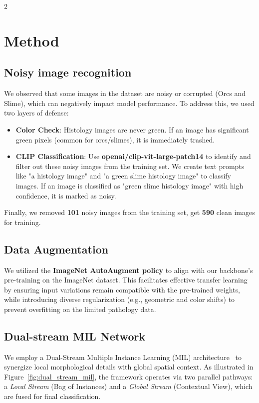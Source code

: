 \documentclass[11pt]{article}
\begin{document}
\begin{multicols}{2}
    \section{Method}
    \subsection{Noisy image recognition}
    We observed that some images in the dataset are noisy or corrupted (Orcs and Slime), which can negatively impact model performance. To address this, we used two layers of defense:
    \begin{itemize}
        \item \textbf{Color Check}: Histology images are never green. If an image has significant green pixels (common for orcs/slimes), it is immediately trashed.
        \item \textbf{CLIP Classification}: Use \textbf{openai/clip-vit-large-patch14} to identify and filter out these noisy images from the training set. We create text prompts like "a histology image" and "a green slime histology image" to classify images. If an image is classified as "green slime histology image" with high confidence, it is marked as noisy.
    \end{itemize}
    Finally, we removed \textbf{101} noisy images from the training set, get \textbf{590} clean images for training.

    \subsection{Data Augmentation}
    We utilized the \textbf{ImageNet AutoAugment policy} to align with our backbone's pre-training on the ImageNet dataset. This facilitates effective transfer learning by ensuring input variations remain compatible with the pre-trained weights, while introducing diverse regularization (e.g., geometric and color shifts) to prevent overfitting on the limited pathology data.

    \subsection{Dual-stream MIL Network}
    We employ a Dual-Stream Multiple Instance Learning (MIL) architecture~\cite{li_dual-stream_2021} to synergize local morphological details with global spatial context. As illustrated in Figure~\ref{fig:dual_stream_mil}, the framework operates via two parallel pathways: a \textit{Local Stream} (Bag of Instances) and a \textit{Global Stream} (Contextual View), which are fused for final classification.


\end{multicols}
\end{document}
